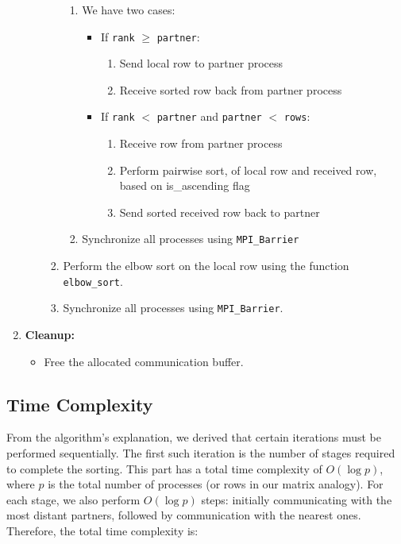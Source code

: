 \documentclass[12pt]{article}
\begin{document}
\begin{enumerate}[nosep]
\begin{itemize}[noitemsep]
\begin{enumerate}
\begin{enumerate}[noitemsep]
                \item We have two cases:
                \begin{itemize}
                    \item If \texttt{rank} $\geq$ \texttt{partner}:
                    \begin{enumerate}[noitemsep]
                        \item Send local row to partner process
                        \item Receive sorted row back from partner process
                    \end{enumerate}

                    \item If \texttt{rank} $<$ \texttt{partner} and \texttt{partner} $<$ \texttt{rows}:
                    \begin{enumerate}[noitemsep]
                        \item Receive row from partner process
                        \item Perform pairwise sort, of local row and received row, based on is\_ascending flag
                        \item Send sorted received row back to partner
                    \end{enumerate}
                \end{itemize}
                
                \item Synchronize all processes using \texttt{MPI\_Barrier}
            \end{enumerate}
            \item Perform the elbow sort on the local row using the function \texttt{elbow\_sort}.
            \item Synchronize all processes using \texttt{MPI\_Barrier}.
        \end{enumerate}
    \end{itemize}

    \item \textbf{Cleanup:}
    \begin{itemize}[noitemsep]
        \item Free the allocated communication buffer.
    \end{itemize}
\end{enumerate}


\subsection{Time Complexity}
From the algorithm's explanation, we derived that certain iterations must be performed sequentially. The first such iteration is the number of stages required to complete the sorting. This part has a total time complexity of \(O(\log p)\), where \(p\) is the total number of processes (or rows in our matrix analogy). For each stage, we also perform \(O(\log p)\) steps: initially communicating with the most distant partners, followed by communication with the nearest ones. Therefore, the total time complexity is:
\end{document}
